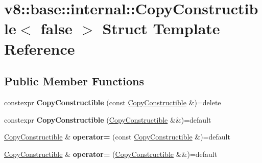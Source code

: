 \hypertarget{structv8_1_1base_1_1internal_1_1CopyConstructible_3_01false_01_4}{}\section{v8\+:\+:base\+:\+:internal\+:\+:Copy\+Constructible$<$ false $>$ Struct Template Reference}
\label{structv8_1_1base_1_1internal_1_1CopyConstructible_3_01false_01_4}
\subsection*{Public Member Functions}
\begin{DoxyCompactItemize}
\item 
\mbox{\label{structv8_1_1base_1_1internal_1_1CopyConstructible_3_01false_01_4_ac491084b9e53a9e0e3be46cdf17cf764}} 
constexpr {\bfseries Copy\+Constructible} (const \mbox{\hyperlink{structv8_1_1base_1_1internal_1_1CopyConstructible}{Copy\+Constructible}} \&)=delete
\item 
\mbox{\label{structv8_1_1base_1_1internal_1_1CopyConstructible_3_01false_01_4_a4b4835dd014f1ff81b4a4db4705f37ab}} 
constexpr {\bfseries Copy\+Constructible} (\mbox{\hyperlink{structv8_1_1base_1_1internal_1_1CopyConstructible}{Copy\+Constructible}} \&\&)=default
\item 
\mbox{\label{structv8_1_1base_1_1internal_1_1CopyConstructible_3_01false_01_4_afea34afa32743e37ec4e02505f1ebb05}} 
\mbox{\hyperlink{structv8_1_1base_1_1internal_1_1CopyConstructible}{Copy\+Constructible}} \& {\bfseries operator=} (const \mbox{\hyperlink{structv8_1_1base_1_1internal_1_1CopyConstructible}{Copy\+Constructible}} \&)=default
\item 
\mbox{\label{structv8_1_1base_1_1internal_1_1CopyConstructible_3_01false_01_4_a78ecab4cedf9410df128af39c407d7e0}} 
\mbox{\hyperlink{structv8_1_1base_1_1internal_1_1CopyConstructible}{Copy\+Constructible}} \& {\bfseries operator=} (\mbox{\hyperlink{structv8_1_1base_1_1internal_1_1CopyConstructible}{Copy\+Constructible}} \&\&)=default
\end{DoxyCompactItemize}


